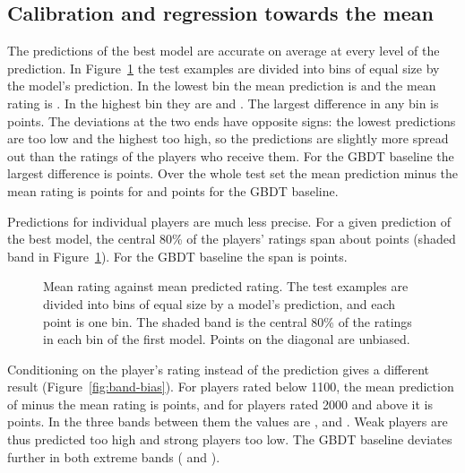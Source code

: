 \documentclass[11pt]{article}
\begin{document}
\subsection{Calibration and regression towards the mean}
\label{sec:calibration}

The predictions of the best model are accurate on average at every level of
the prediction. In Figure~\ref{fig:reliability} the test examples are divided
into  bins of equal size by the model's
prediction. In the lowest bin the mean prediction is
 and the mean rating is
. In the highest bin they are
 and .
The largest difference in any bin is  points.
The deviations at the two ends have opposite signs: the lowest predictions
are too low and the highest too high, so the predictions are slightly more
spread out than the ratings of the players who receive them. For the GBDT
baseline the largest difference is 
points. Over the whole test set the mean prediction minus the mean rating is
 points for  and
 points for the GBDT baseline.

Predictions for individual players are much less precise. For a given
prediction of the best model, the central 80\% of the players' ratings span
about  points (shaded band in
Figure~\ref{fig:reliability}). For the GBDT baseline the span is
 points.

\begin{figure}[htbp]\centering
{}
\caption{Mean rating against mean predicted rating. The test examples are
divided into bins of equal size by a model's prediction, and each point is
one bin. The shaded band is the central 80\% of the ratings in each bin of
the first model. Points on the diagonal are unbiased.}
\label{fig:reliability}
\end{figure}

Conditioning on the player's rating instead of the prediction gives a
different result (Figure~\ref{fig:band-bias}). For players rated below 1100,
the mean prediction of  minus the mean rating is
 points, and for players rated 2000 and
above it is  points. In the three bands
between them the values are ,
 and
. Weak players are thus predicted too
high and strong players too low. The GBDT baseline deviates further in both
extreme bands ( and
).
\end{document}
